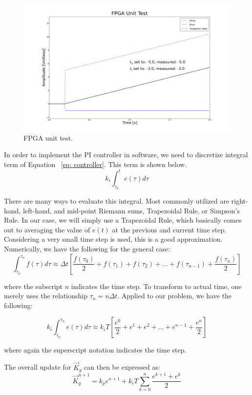 \documentclass[a4paper,12pt]{article}
\newcommand{\be}{\begin{equation}}
\newcommand{\ee}{\end{equation}}
\begin{document}
\begin{figure}
\centering
\includegraphics[scale=0.25]{../figures/fpga_unit_test.png}
\caption{FPGA unit test.}
\label{fig:fpga_unit_test}
\end{figure}

In order to implement the PI controller in software, we need to discretize integral term of Equation ~\ref{eq: controller}. This term is shown below. 
\be
k_{i} \int_{\tau_{0}}^{t} e(\tau)d\tau
\ee

There are many ways to evaluate this integral. Most commonly utilized are right-hand, left-hand, and mid-point Riemann sums, Trapezoidal Rule, or Simpson's Rule. In our case, we will simply use a Trapezoidal Rule, which basically comes out to averaging the value of $e(t)$ at the previous and current time step. Considering a very small time step is used, this is a good approximation. Numerically, we have the following for the general case:
\be
\int_{\tau_{0}}^{\tau_{n}} f(\tau) d\tau \approx \Delta t
		    \left[\frac{f(\tau_{0})}{2} + f(\tau_{1}) + f(\tau_{2}) + ...
		      + f(\tau_{n-1}) + \frac{f(\tau_{n})}{2}\right]
\ee

\noindent where the subscript $n$ indicates the time step. To transform to actual time, one merely uses the relationship $\tau_{n} = n\Delta t$. Applied to our problem, we have the following: 

\be
k_{i} \int_{\tau_{0}}^{\tau_{n}} e(\tau)d\tau \approx k_{i}T
	      \left[\frac{e^{0}}{2} + e^{1} + e^{2} + ... 
		+ e^{n-1} + \frac{e^{n}}{2} \right]
\ee

\noindent where again the superscript notation indicates the time step. 

The overall update for $\vec{K}_{g}$ can then be expressed as:
\be \label{eq: controller_dis}
\vec{K}_{g}^{n+1} = k_{p} e^{n+1} + k_{i}T \sum_{k=0}^{n}\frac{e^{k+1}+e^k}{2}
\ee
\end{document}
